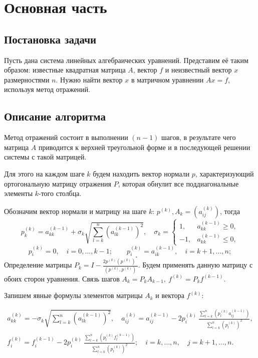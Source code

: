 \section{Основная часть}
    \subsection{Постановка задачи}
        Пусть дана система линейных алгебраических уравнений. Представим её таким образом: известные квадратная матрица $A$, вектор $f$ и неизвестный вектор $x$ размерностями $n$. Нужно найти вектор $x$ в матричном уравнении $Ax = f$, используя метод отражений.
        
    \subsection{Описание алгоритма}
        Метод отражений состоит в выполнении $(n-1)$ шагов, в результате чего матрица $A$ приводится к верхней треугольной форме и в последующей решении системы с такой матрицей.

        Для этого на каждом шаге $k$ будем находить вектор нормали $p$, характеризующий ортогональную матрицу отражения $P$, которая обнулит все поддиагональные элементы $k$-того столбца.

        Обозначим вектор нормали и матрицу на шаге $k$: $p^{(k)}, A_{k} = \left( a_{ij}^{(k)} \right)$, тогда
        \[
            p_k^{(k)} = a_{kk}^{(k-1)} + \sigma_k \sqrt{\sum_{l=k}^{n} \left( a_{lk}^{(k-1)} \right)^2 }, \quad \sigma_k = \left\{
                \begin{matrix}
                    1, & a_{kk}^{(k-1)} \geq 0, \\
                    -1, & a_{kk}^{(k-1)} \leq 0,
                \end{matrix}
            \right.
        \]
        \[
            p_i^{(k)} = 0, \quad i = 0, \dots, k - 1; \qquad p_i^{(k)} = a_{ik}^{(k-1)} , \quad i = k+1, \dots, n;
        \]
        Определение матрицы $ P_k = I - \frac{2 p^{(k)} \left(p^{(k)}\right)^*}{(p^{(k)},p^{(k)})}$. Будем применять данную матрицу с обоих сторон уравнения. Связь шагов $ A_k = P_k A_{k-1},~ f^{(k)} = P_k f^{(k-1)} $. 
        
        Запишем явные формулы элементов матрицы $ A_k $ и вектора $ f^{(k)} $:
        
        \[
            \begin{split}
                a_{kk}^{(k)} = - \sigma_k \sqrt{\sum_{l=k}^{n} \left( a_{lk}^{(k-1)} \right)^2 }, \quad
                a_{ij}^{(k)} = a_{ij}^{(k-1)} - 2 p_i^{(k)} ~\frac{\sum\limits_{l=k}^{n} \left( p_l^{(k)} a_{lj}^{(k-1)} \right)}{\sum\limits_{l=k}^{n} \left( p_{l}^{(k)} \right)^2}, \\
                f_i^{(k)} = f_i^{(k-1)} - 2 p_i^{(k)} ~\frac{\sum\limits_{l=k}^{n} \left( p_l^{(k)} f_l^{(k-1)} \right)}{\sum\limits_{l=k}^{n} \left( p_{l}^{(k)} \right)^2}; \quad
                i = k, \dots, n, \quad j = k+1, \dots, n.
            \end{split}
        \]

